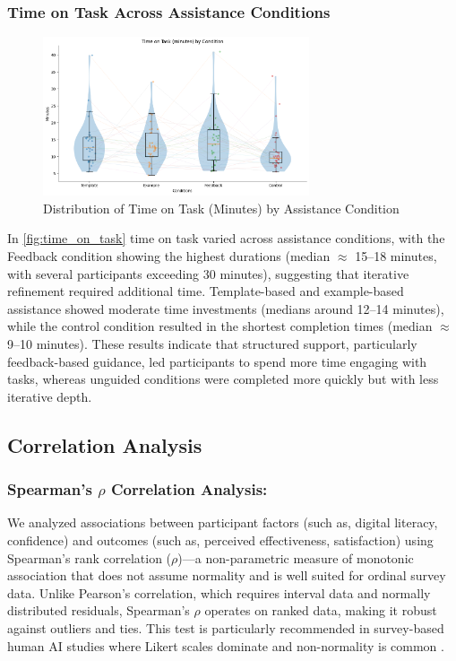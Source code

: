 \subsubsection{Time on Task Across Assistance Conditions}
\FloatBarrier
\usepackage{:}
\begin{figure}[h]
\centering
\includegraphics[width=0.7\textwidth]{figures/08.png}
\caption{Distribution of Time on Task (Minutes) by Assistance Condition}
\label{fig:time_on_task}
\end{figure}

In \autoref{fig:time_on_task} time on task varied across assistance conditions, with the Feedback condition showing the highest durations (median $\approx$ 15–18 minutes, with several participants exceeding 30 minutes), suggesting that iterative refinement required additional time. Template-based and example-based assistance showed moderate time investments (medians around 12–14 minutes), while the control condition resulted in the shortest completion times (median $\approx$ 9–10 minutes). These results indicate that structured support, particularly feedback-based guidance, led participants to spend more time engaging with tasks, whereas unguided conditions were completed more quickly but with less iterative depth.

\subsection{\textbf{Correlation Analysis}}

\subsubsection{Spearman's $\rho$ Correlation Analysis:}

We analyzed associations between participant factors (such as, digital literacy, confidence) and outcomes (such as, perceived effectiveness, satisfaction) using Spearman's rank correlation ($\rho$)—a non-parametric measure of monotonic association that does not assume normality and is well suited for ordinal survey data. Unlike Pearson's correlation, which requires interval data and normally distributed residuals, Spearman's $\rho$ operates on ranked data, making it robust against outliers and ties. This test is particularly recommended in survey-based human AI studies where Likert scales dominate and non-normality is common \cite{tyagi2022use,winter2024comparing}.

